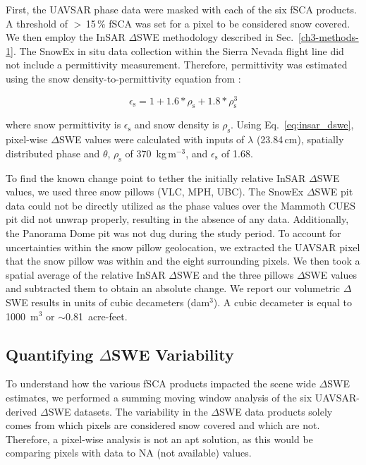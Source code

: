 First, the UAVSAR phase data were masked with each of the six fSCA products. A threshold of $>$\,15\,\% fSCA was set for a pixel to be considered snow covered. We then employ the InSAR $\Delta$SWE methodology described in Sec.~\ref{ch3-methods-1}. The SnowEx in situ data collection within the Sierra Nevada flight line did not include a permittivity measurement. Therefore, permittivity was estimated using the snow density-to-permittivity equation from \cite{guneriussenInSAREstimationChanges2001}:

\begin{equation}
\epsilon_\mathrm{s} = 1 + 1.6 * \rho_\mathrm{s} + 1.8 * \rho_\mathrm{s}^3
\label{eq:dens_to_perm}
\end{equation}

\noindent where snow permittivity is $\epsilon_\mathrm{s}$ and snow density is $\rho_\mathrm{s}$. Using Eq.~\ref{eq:insar_dswe}, pixel-wise $\Delta$SWE values were calculated with inputs of $\lambda$ (23.84\,cm), spatially distributed phase and $\theta$, $\rho_\mathrm{s}$ of 370~kg\,m$^{-3}$, and $\epsilon_\mathrm{s}$ of 1.68. 

To find the known change point to tether the initially relative InSAR $\Delta$SWE values, we used three snow pillows (VLC, MPH, UBC). The SnowEx $\Delta$SWE pit data could not be directly utilized as the phase values over the Mammoth CUES pit did not unwrap properly, resulting in the absence of any data. Additionally, the Panorama Dome pit was not dug during the study period. To account for uncertainties within the snow pillow geolocation, we extracted the UAVSAR pixel that the snow pillow was within and the eight surrounding pixels. We then took a spatial average of the relative InSAR $\Delta$SWE and the three pillows $\Delta$SWE values and subtracted them to obtain an absolute change. We report our volumetric $\Delta$SWE results in units of cubic decameters (dam$^{3}$). A cubic decameter is equal to 1000~m$^{3}$ or $\sim$0.81~acre-feet.

\hypertarget{ch4-methods-2}{\subsection{Quantifying $\Delta$SWE Variability}\label{ch4-methods-1}}

To understand how the various fSCA products impacted the scene wide $\Delta$SWE estimates, we performed a summing moving window analysis of the six UAVSAR-derived $\Delta$SWE datasets. The variability in the $\Delta$SWE data products solely comes from which pixels are considered snow covered and which are not. Therefore, a pixel-wise analysis is not an apt solution, as this would be comparing pixels with data to  NA (not available) values.

